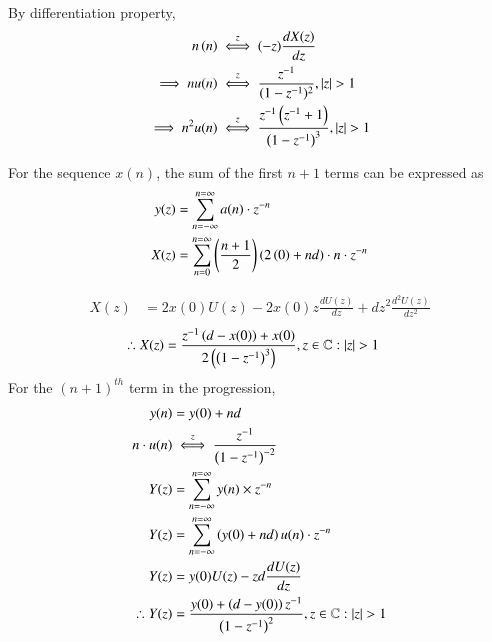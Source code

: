 \documentclass[journal,12pt,twocolumn]{IEEEtran}
\theoremstyle{remark}
\begin{document}
\begin{enumerate}
By differentiation property,
\begin{align}
    n\brak{n} &\overset{z} \iff (-z)\frac{dX(z)}{dz}\\
    \implies nu(n) &\overset{z}\iff \frac{z^{-1}}{(1-z^{-1})^2}, |z|>1 \\
    \implies n^{2}u(n) &\overset{z}\iff \frac{z^{-1}\brak{z^{-1}+1}}{\brak{1-z^{-1}}^3}, |z|>1
\end{align}

For the sequence \(x(n)\), the sum of the first \(n + 1\) terms can be expressed as
\begin{align}
y(z) &= \sum_{n=-\infty}^{n=\infty} a(n)\cdot z^{-n}\\
X(z) &= \sum_{n=0}^{n=\infty}\left(\frac{n+1}{2}\right)(2\left(0\right)+nd)\cdot n\cdot z^{-n}
\end{align}

\begin{align}
    X(z) &= 2x(0)U(z) - 2x(0)z\frac{dU(z)}{dz}+dz^2\frac{d^2U(z)}{dz^2} 
\end{align}
\begin{align}
\therefore X(z) &= \frac{z^{-1}\brak{d-x(0)}+x(0)}{2\brak{\brak{
1-z^{-1}}^3}}, {z\in \mathbb{C}:|z|>1} 
\end{align}
For the $(n+1)^{th}$ term in the progression,
\begin{align}
    y(n) &= y(0)+nd\\
    n\cdot u(n) &\overset{z}\iff \frac{z^{-1}}{\brak{1-z^{-1}}^{-2}}\\
    Y(z) &= \sum_{n=-\infty}^{n=\infty}y(n)\times z^{-n}\\
    Y(z) &= \sum_{n=-\infty}^{n=\infty}\brak{y(0)+nd}u(n)\cdot z^{-n}\\
    Y(z) &= y(0)U(z)-zd\frac{dU(z)}{dz}\\
    \therefore Y(z) &= \frac{y(0)+\brak{d-y(0)}z^{-1}}{\brak{1-z^{-1}}^2}, {z \in \mathbb{C}: |z|>1}
\end{align}
\end{enumerate}
\end{document}
